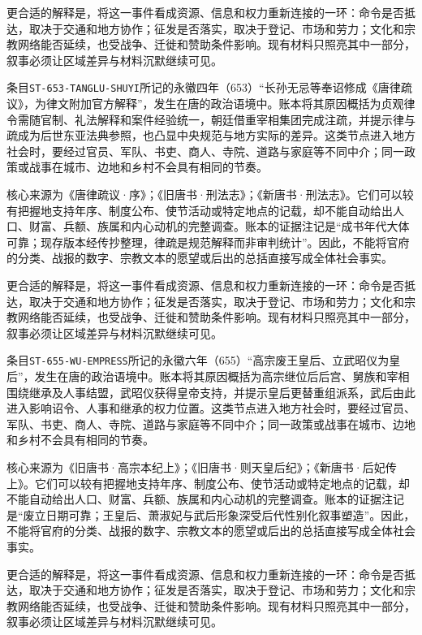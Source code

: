 更合适的解释是，将这一事件看成资源、信息和权力重新连接的一环：命令是否抵达，取决于交通和地方协作；征发是否落实，取决于登记、市场和劳力；文化和宗教网络能否延续，也受战争、迁徙和赞助条件影响。现有材料只照亮其中一部分，叙事必须让区域差异与材料沉默继续可见。


条目\texttt{ST-653-TANGLU-SHUYI}所记的永徽四年（653）“长孙无忌等奉诏修成《唐律疏议》，为律文附加官方解释”，发生在唐的政治语境中。账本将其原因概括为贞观律令需随官制、礼法解释和案件经验统一，朝廷借重宰相集团完成注疏，并提示律与疏成为后世东亚法典参照，也凸显中央规范与地方实际的差异。这类节点进入地方社会时，要经过官员、军队、书吏、商人、寺院、道路与家庭等不同中介；同一政策或战事在城市、边地和乡村不会具有相同的节奏。

核心来源为《唐律疏议·序》；《旧唐书·刑法志》；《新唐书·刑法志》。它们可以较有把握地支持年序、制度公布、使节活动或特定地点的记载，却不能自动给出人口、财富、兵额、族属和内心动机的完整调查。账本的证据注记是“成书年代大体可靠；现存版本经传抄整理，律疏是规范解释而非审判统计”。因此，不能将官府的分类、战报的数字、宗教文本的愿望或后出的总括直接写成全体社会事实。

更合适的解释是，将这一事件看成资源、信息和权力重新连接的一环：命令是否抵达，取决于交通和地方协作；征发是否落实，取决于登记、市场和劳力；文化和宗教网络能否延续，也受战争、迁徙和赞助条件影响。现有材料只照亮其中一部分，叙事必须让区域差异与材料沉默继续可见。


条目\texttt{ST-655-WU-EMPRESS}所记的永徽六年（655）“高宗废王皇后、立武昭仪为皇后”，发生在唐的政治语境中。账本将其原因概括为高宗继位后后宫、舅族和宰相围绕继承及人事结盟，武昭仪获得皇帝支持，并提示皇后更替重组派系，武后由此进入影响诏令、人事和继承的权力位置。这类节点进入地方社会时，要经过官员、军队、书吏、商人、寺院、道路与家庭等不同中介；同一政策或战事在城市、边地和乡村不会具有相同的节奏。

核心来源为《旧唐书·高宗本纪上》；《旧唐书·则天皇后纪》；《新唐书·后妃传上》。它们可以较有把握地支持年序、制度公布、使节活动或特定地点的记载，却不能自动给出人口、财富、兵额、族属和内心动机的完整调查。账本的证据注记是“废立日期可靠；王皇后、萧淑妃与武后形象深受后代性别化叙事塑造”。因此，不能将官府的分类、战报的数字、宗教文本的愿望或后出的总括直接写成全体社会事实。

更合适的解释是，将这一事件看成资源、信息和权力重新连接的一环：命令是否抵达，取决于交通和地方协作；征发是否落实，取决于登记、市场和劳力；文化和宗教网络能否延续，也受战争、迁徙和赞助条件影响。现有材料只照亮其中一部分，叙事必须让区域差异与材料沉默继续可见。

